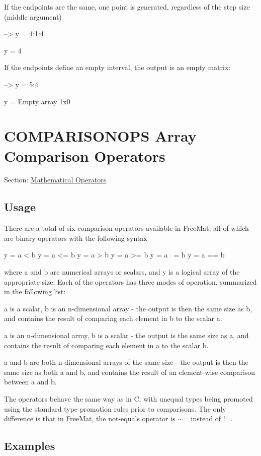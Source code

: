 If the endpoints are the same, one point is generated, regardless of the step size (middle argument)


\begin{DoxyVerbInclude}
--> y = 4:1:4

y = 
 4 
\end{DoxyVerbInclude}


If the endpoints define an empty interval, the output is an empty matrix\-:


\begin{DoxyVerbInclude}
--> y = 5:4

y = 
  Empty array 1x0
\end{DoxyVerbInclude}
 \hypertarget{operators_comparisonops}{}\section{C\-O\-M\-P\-A\-R\-I\-S\-O\-N\-O\-P\-S Array Comparison Operators}\label{operators_comparisonops}
Section\-: \hyperlink{sec_operators}{Mathematical Operators} \hypertarget{vtkwidgets_vtkxyplotwidget_Usage}{}\subsection{Usage}\label{vtkwidgets_vtkxyplotwidget_Usage}
There are a total of six comparison operators available in Free\-Mat, all of which are binary operators with the following syntax \begin{DoxyVerb}  y = a < b
  y = a <= b
  y = a > b
  y = a >= b
  y = a ~= b
  y = a == b
\end{DoxyVerb}
 where {\ttfamily a} and {\ttfamily b} are numerical arrays or scalars, and {\ttfamily y} is a {\ttfamily logical} array of the appropriate size. Each of the operators has three modes of operation, summarized in the following list\-: 
\begin{DoxyEnumerate}
\item {\ttfamily a} is a scalar, {\ttfamily b} is an n-\/dimensional array -\/ the output is then the same size as {\ttfamily b}, and contains the result of comparing each element in {\ttfamily b} to the scalar {\ttfamily a}.  
\item {\ttfamily a} is an n-\/dimensional array, {\ttfamily b} is a scalar -\/ the output is the same size as {\ttfamily a}, and contains the result of comparing each element in {\ttfamily a} to the scalar {\ttfamily b}.  
\item {\ttfamily a} and {\ttfamily b} are both n-\/dimensional arrays of the same size -\/ the output is then the same size as both {\ttfamily a} and {\ttfamily b}, and contains the result of an element-\/wise comparison between {\ttfamily a} and {\ttfamily b}.  
\end{DoxyEnumerate}The operators behave the same way as in {\ttfamily C}, with unequal types being promoted using the standard type promotion rules prior to comparisons. The only difference is that in Free\-Mat, the not-\/equals operator is {\ttfamily $\sim$=} instead of {\ttfamily !=}. \hypertarget{variables_matrix_Examples}{}\subsection{Examples}\label{variables_matrix_Examples}
